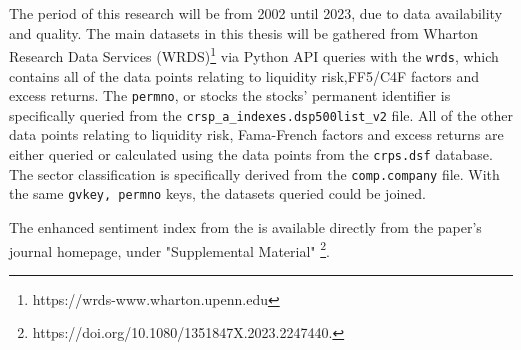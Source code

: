 
The period of this research will be from 2002 until 2023, due to data availability and quality. The main datasets in this thesis will be gathered from Wharton Research Data Services (WRDS)\footnote{https://wrds-www.wharton.upenn.edu} via Python API queries with the \texttt{wrds}, which contains all of the data points relating to liquidity risk,FF5/C4F factors and excess returns. The \texttt{permno}, or stocks the stocks' permanent identifier is specifically queried from the \texttt{crsp\_a\_indexes.dsp500list\_v2}
file. All of the other data points relating to liquidity risk, Fama-French factors and excess returns are either queried or calculated using the data points from the \texttt{crps.dsf} database. The sector classification is specifically derived from the \texttt{comp.company} file. With the same \texttt{gvkey, permno} keys, the datasets queried could be joined.

The enhanced sentiment index from the  is available directly from the paper's journal homepage, under "Supplemental Material" \footnote{https://doi.org/10.1080/1351847X.2023.2247440.}.